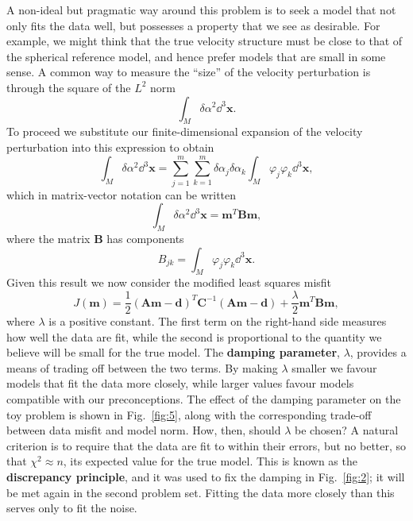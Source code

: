 A non-ideal but pragmatic way around this problem is to seek a model that not only fits the data well, but possesses
 a property that we see as desirable. For example, we might think that the true velocity structure must be close to that
  of the spherical reference model, and hence prefer models that are small in some sense. A common way to measure the
   ``size'' of the velocity perturbation is through the square of the $L^{2}$ norm
\begin{equation}
    \int_{M} \delta\alpha^{2} \dd^{3}\mathbf{x}.
    \label{eq:20}
\end{equation}
To proceed we substitute our finite-dimensional expansion of the velocity perturbation into this expression to obtain
\begin{equation}
    \int_{M} \delta\alpha^{2} \dd^{3}\mathbf{x} = \sum_{j=1}^{m}\sum_{k=1}^{m} \delta\alpha_{j}\delta\alpha_{k} \int_{M}
     \varphi_{j}\varphi_{k} \dd^{3}\mathbf{x},
    \label{eq:21}
\end{equation}
which in matrix-vector notation can be written
\begin{equation}
    \int_{M} \delta\alpha^{2} \dd^{3}\mathbf{x} = \mathbf{m}^{T}\mathbf{B}\mathbf{m},
    \label{eq:22}
\end{equation}
where the matrix $\mathbf{B}$ has components
\begin{equation}
    B_{jk} = \int_{M} \varphi_{j}\varphi_{k} \dd^{3}\mathbf{x}.
    \label{eq:23}
\end{equation}
Given this result we now consider the modified least squares misfit
\begin{equation}
    J(\mathbf{m}) = \frac{1}{2} (\mathbf{A}\mathbf{m} - \mathbf{d})^{T} \mathbf{C}^{-1} (\mathbf{A}\mathbf{m} -
     \mathbf{d}) + \frac{\lambda}{2} \mathbf{m}^{T}\mathbf{B}\mathbf{m},
    \label{eq:24}
\end{equation}
where $\lambda$ is a positive constant. The first term on the right-hand side measures how well the data are fit, while
 the second is proportional to the quantity we believe will be small for the true model. The \textbf{damping parameter}, $\lambda$,
provides a means of trading off between the two terms. By making $\lambda$ smaller we favour models that fit the data more 
closely, while larger values favour models compatible with our preconceptions. The effect of the damping parameter on the 
toy problem is shown in Fig.~\ref{fig:5}, along with the corresponding trade-off between data misfit and model norm. 
How, then, should $\lambda$ be chosen? A natural criterion is to require that the data are fit to within their errors, 
but no better, so that $\chi^{2}\approx n$, its expected value for the true model. This is known as the \textbf{discrepancy 
principle}, and it was used to fix the damping in Fig.~\ref{fig:2}; it will be met again in the second problem set. 
Fitting the data more closely than this serves only to fit the noise.


